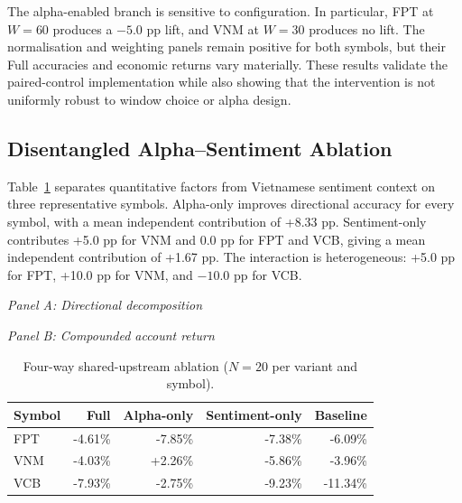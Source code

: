 The alpha-enabled branch is sensitive to configuration. In particular, FPT at $W=60$ produces a $-5.0$ pp lift, and VNM at $W=30$ produces no lift. The normalisation and weighting panels remain positive for both symbols, but their Full accuracies and economic returns vary materially. These results validate the paired-control implementation while also showing that the intervention is not uniformly robust to window choice or alpha design.

\subsection{Disentangled Alpha--Sentiment Ablation}

Table~\ref{tab:disentangled_ablation} separates quantitative factors from Vietnamese sentiment context on three representative symbols. Alpha-only improves directional accuracy for every symbol, with a mean independent contribution of +8.33 pp. Sentiment-only contributes +5.0 pp for VNM and 0.0 pp for FPT and VCB, giving a mean independent contribution of +1.67 pp. The interaction is heterogeneous: +5.0 pp for FPT, +10.0 pp for VNM, and $-10.0$ pp for VCB.

\begin{table}[!htb]
\centering
\caption{Four-way shared-upstream ablation ($N=20$ per variant and symbol).}
\label{tab:disentangled_ablation}
\renewcommand{\arraystretch}{1.1}
\setlength{\tabcolsep}{3pt}

\textit{Panel A: Directional decomposition}


\vspace{0.7em}
\textit{Panel B: Compounded account return}

\begin{tabular}{lrrrr}
\hline
\textbf{Symbol} & \textbf{Full} & \textbf{Alpha-only} & \textbf{Sentiment-only} & \textbf{Baseline} \\
\hline
FPT & -4.61\% & -7.85\% & -7.38\% & -6.09\% \\
VNM & -4.03\% & +2.26\% & -5.86\% & -3.96\% \\
VCB & -7.93\% & -2.75\% & -9.23\% & -11.34\% \\
\hline
\end{tabular}
\end{table}

